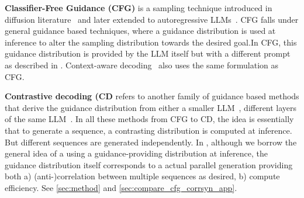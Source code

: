 \textbf{Classifier-Free Guidance (CFG)} is a sampling technique introduced in diffusion literature~\cite{ho2021classifierfree} and later extended to autoregressive LLMs~\cite{sanchez2023stay}. CFG falls under general guidance based techniques, where a guidance distribution is used at inference to alter the sampling distribution towards the desired goal.In CFG, this guidance distribution is provided by the LLM itself but with a different prompt as described in . Context-aware decoding~\citet{Shi2023TrustingYE} also uses the same formulation as CFG.

\textbf{Contrastive decoding (CD} refers to another family of guidance based methods that derive the guidance distribution from either a smaller LLM~\cite{o2023contrastive,li2023contrastive}, different layers of the same LLM~\cite{chuang2023dola,gera-etal-2023-benefits}. In all these methods from CFG to CD, the idea is essentially that to generate a sequence, a contrasting distribution is computed at inference. But different sequences are generated independently. In \corrsyn{}, although we borrow the general idea of a using a guidance-providing distribution at inference, the guidance distribution itself corresponds to a actual parallel generation providing both a) (anti-)correlation between multiple sequences as desired, b) compute efficiency. See \autoref{sec:method} and \autoref{sec:compare_cfg_corrsyn_app}.

